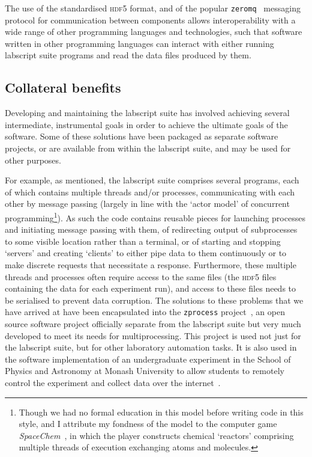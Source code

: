 The use of the standardised \textsc{hdf5} format, and of the popular \texttt{zeromq}~\cite{zeromq_guide} messaging protocol for communication between components allows interoperability with a wide range of other programming languages and technologies, such that software written in other programming languages can interact with either running labscript suite programs and read the data files produced by them.


\subsection{Collateral benefits}

Developing and maintaining the labscript suite has involved achieving several intermediate, instrumental goals in order to achieve the ultimate goals of the software. Some of these solutions have been packaged as separate software projects, or are available from within the labscript suite, and may be used for other purposes.

For example, as mentioned, the labscript suite comprises several programs, each of which contains multiple threads and/or processes, communicating with each other by message passing (largely in line with the `actor model' of concurrent programming\footnote{Though we had no formal education in this model before writing code in this style, and I attribute my fondness of the model to the computer game \emph{SpaceChem}~\cite{zachtronics_industries_spacechem_2011}, in which the player constructs chemical `reactors' comprising multiple threads of execution exchanging atoms and molecules.}). As such the code contains reusable pieces for launching processes and initiating message passing with them, of redirecting output of subprocesses to some visible location rather than a terminal, or of starting and stopping `servers' and creating `clients' to either pipe data to them continuously or to make discrete requests that necessitate a response. Furthermore, these multiple threads and processes often require access to the same files (the \textsc{hdf5} files containing the data for each experiment run), and access to these files needs to be serialised to prevent data corruption. The solutions to these problems that we have arrived at have been encapsulated into the \texttt{zprocess} project~\cite{christopher_j._billington_zprocess_2018}, an open source software project officially separate from the labscript suite but very much developed to meet its needs for multiprocessing. This project is used not just for the labscript suite, but for other laboratory automation tasks. It is also used in the software implementation of an undergraduate experiment in the School of Physics and Astronomy at Monash University to allow students to remotely control the experiment and collect data over the internet~\cite{monash_university_school_of_physics_and_astronomy_measurement_2016}.

